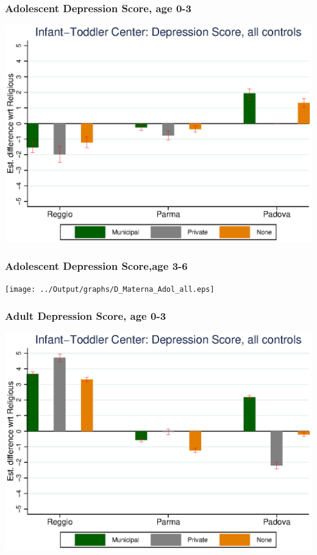 \documentclass{beamer}
\begin{document}
\begin{frame}\frametitle{Adolescent Depression Score, age 0-3}
\center
\includegraphics[scale=0.7]{../Output/graphs/D_Asilo_Adol_all.eps}
\end{frame}


\begin{frame}\frametitle{Adolescent Depression Score,age 3-6}
\center
\texttt{[image: ../Output/graphs/D\_Materna\_Adol\_all.eps]}
\end{frame}

\begin{frame}\frametitle{Adult Depression Score, age 0-3}
\center
\includegraphics[scale=0.7]{../Output/graphs/D_Asilo_Adult_all.eps}
\end{frame}
\end{document}
